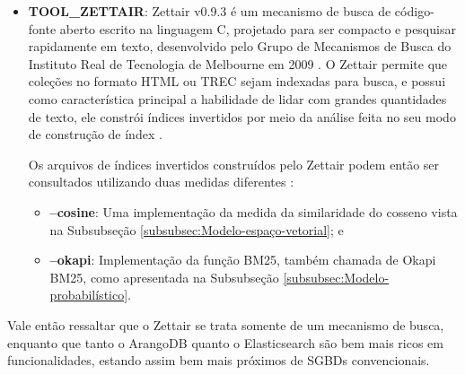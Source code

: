 \begin{itemize}
        Utiliza da linguagem de consulta AQL (\textit{ArangoDB Query Language}) para recuperar e modificar dados, que, por meio das \textit{views}\footnote{``Uma \textit{view} (visão) em terminologia SQL é uma única tabela que é derivada de outras tabelas [$\cdots$]  é considerada uma tabela virtual'' \cite[p.~88]{ElmasriSBD2010}. } do tipo arangosearch, introduz uma camada de integração com a biblioteca IResearch\footnote{Biblioteca de mecanismo de busca orientada a documentos, multiplataforma, e de alto desempenho, escrita inteiramente em C++, com o foco em uma conectividade de diferentes modelos de ranqueamento/similaridade \cite{IRESEARCH_GITHUB_2019}.}.
        Assim, por meio da AQL integrada ao IResearch, o ArangoDB fornece funções de ordenação de documentos mediante uma consulta, e, dentre elas, a função BM25() faz uma implementação do algoritmo da função de ranqueamento BM25 \cite{ARANGODB_SEARCHVIEWS_2019}.
        
        \item \textbf{TOOL\_ZETTAIR}: Zettair v0.9.3 é um mecanismo de busca de código-fonte aberto escrito na linguagem C, projetado para ser compacto e pesquisar rapidamente em texto, desenvolvido pelo Grupo de Mecanismos de Busca do Instituto Real de Tecnologia de Melbourne em 2009 \cite{ZETTAIR_HOME_2009}.
        O Zettair permite que coleções no formato HTML ou TREC sejam indexadas para busca, e possui como característica principal a habilidade de lidar com grandes quantidades de texto, ele constrói índices invertidos por meio da análise feita no seu modo de construção de índex \cite{ZETTAIR_INDEX_2009}.
        
        Os arquivos de índices invertidos construídos pelo Zettair podem então ser consultados utilizando duas medidas diferentes \cite{ZETTAIR_USAGE_2009}:
        \begin{itemize}
            \item \textbf{--cosine}: Uma implementação da medida da similaridade do cosseno vista na Subsubseção \ref{subsubsec:Modelo-espaço-vetorial}; e
            
            \item \textbf{--okapi}: Implementação da função BM25, também chamada de Okapi BM25, como apresentada na Subsubseção \ref{subsubsec:Modelo-probabilístico}.
        \end{itemize}
        
    \end{itemize}
    Vale então ressaltar que o Zettair se trata somente de um mecanismo de busca, enquanto que tanto o ArangoDB quanto o Elasticsearch são bem mais ricos em funcionalidades, estando assim bem mais próximos de SGBDs convencionais.
    


